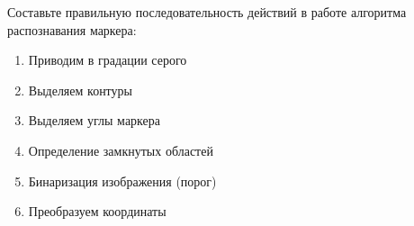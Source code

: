 
Составьте правильную последовательность действий в работе алгоритма распознавания маркера:

\begin{enumerate}
    \item Приводим в градации серого
    \item Выделяем контуры
    \item Выделяем углы маркера
    \item Определение замкнутых областей
    \item Бинаризация изображения (порог)
    \item Преобразуем координаты
\end{enumerate}

